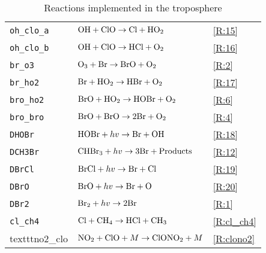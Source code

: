 \begin{table}[ht]
{\begin{tabular}{|l|l|l|}
\texttt{oh\_clo\_a}              & $\mathrm{OH} + \mathrm{ClO} \rightarrow \mathrm{Cl} + \mathrm{HO_2}$                              & \ref{R:15} \\
\texttt{oh\_clo\_b}              & $\mathrm{OH} + \mathrm{ClO} \rightarrow \mathrm{HCl} + \mathrm{O_2}$                              & \ref{R:16} \\
\texttt{br\_o3}                  & $\mathrm{O_3} + \mathrm{Br} \rightarrow \mathrm{BrO} + \mathrm{O_2}$                              & \ref{R:2} \\
\texttt{br\_ho2}                 & $\mathrm{Br} + \mathrm{HO_2} \rightarrow \mathrm{HBr} + \mathrm{O_2}$                             & \ref{R:17} \\
\texttt{bro\_ho2}                & $\mathrm{BrO} + \mathrm{HO_2} \rightarrow \mathrm{HOBr} + \mathrm{O_2}$                                    & \ref{R:6} \\
\texttt{bro\_bro}                & $\mathrm{BrO} + \mathrm{BrO} \rightarrow 2\mathrm{Br} + \mathrm{O_2}$                             & \ref{R:4} \\
\texttt{DHOBr}                   & $\mathrm{HOBr} + hv \rightarrow \mathrm{Br} + \mathrm{OH}$                                      & \ref{R:18} \\
\texttt{DCH3Br}                  & $\mathrm{CHBr_3} + hv \rightarrow 3\mathrm{Br} + \mathrm{Products}$                             & \ref{R:12} \\
\texttt{DBrCl}                   & $\mathrm{BrCl} + hv \rightarrow \mathrm{Br} + \mathrm{Cl}$                                      & \ref{R:19} \\
\texttt{DBrO}                    & $\mathrm{BrO} + hv \rightarrow \mathrm{Br} + \mathrm{O}$                                        & \ref{R:20} \\
\texttt{DBr2}                    & $\mathrm{Br_2} + hv \rightarrow 2\mathrm{Br} $                                                & \ref{R:1} \\
\texttt{cl\_ch4}                    & $\mathrm{Cl} + \mathrm{CH_4} \rightarrow \mathrm{HCl} + \mathrm{CH_3} $                                                & \ref{R:cl_ch4} \\
texttt{no2\_clo}                    & $\mathrm{NO_2} + \mathrm{ClO} + M \rightarrow \mathrm{ClONO_2} + M $                                                & \ref{R:clono2} \\
\hline
\end{tabular}
}
\caption{Reactions implemented in the troposphere}
\label{tab:3}
\end{table}